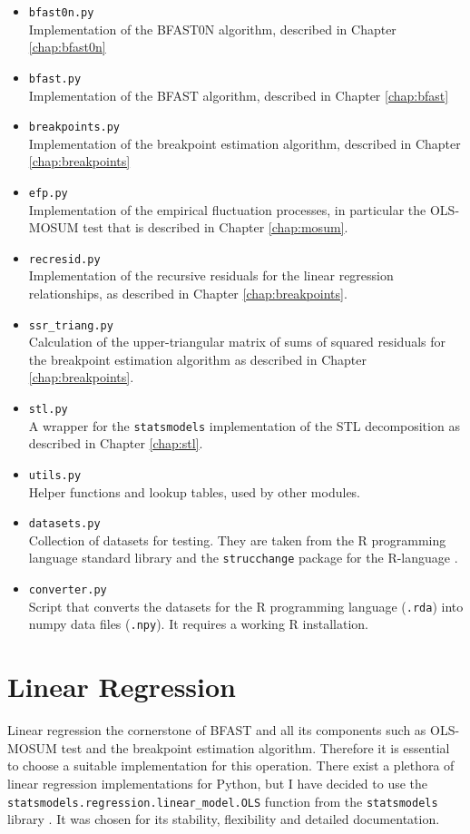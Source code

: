 \documentclass[main.tex]{subfiles}
\begin{document}
\begin{itemize}
\item \texttt{bfast0n.py}\\
  Implementation of the BFAST0N algorithm, described in Chapter \ref{chap:bfast0n}
\item \texttt{bfast.py}\\
  Implementation of the BFAST algorithm, described in Chapter \ref{chap:bfast}
\item \texttt{breakpoints.py}\\
  Implementation of the breakpoint estimation algorithm, described in Chapter \ref{chap:breakpoints}
\item \texttt{efp.py}\\
  Implementation of the empirical fluctuation processes, in particular the OLS-MOSUM test that is
  described in Chapter \ref{chap:mosum}.
\item \texttt{recresid.py}\\
  Implementation of the recursive residuals for the linear regression relationships,
  as described in Chapter \ref{chap:breakpoints}.
\item \texttt{ssr\_triang.py}\\
  Calculation of the upper-triangular matrix of sums of squared residuals for
  the breakpoint estimation algorithm as described in Chapter \ref{chap:breakpoints}.
\item \texttt{stl.py} \\
  A wrapper for the \texttt{statsmodels} \cite{statsmodels} implementation of the STL decomposition as
  described in Chapter \ref{chap:stl}.
\item \texttt{utils.py} \\
  Helper functions and lookup tables, used by other modules. 
\item \texttt{datasets.py}\\
  Collection of datasets for testing. They are taken from the R programming language standard library
  \cite{r-datasets} and
  the \texttt{strucchange} package for the R-language \cite{strucchange_code}.
\item \texttt{converter.py}\\
  Script that converts the datasets for the R programming language (\texttt{.rda}) into numpy
  data files (\texttt{.npy}). It requires a working R installation.
\end{itemize}

\section{Linear Regression}
\label{sec:linear_regression}
Linear regression the cornerstone of BFAST and all
its components such as OLS-MOSUM test and the breakpoint estimation
algorithm. Therefore it is essential to choose a suitable
implementation for this operation. There exist a plethora of linear regression
implementations for Python, but I have decided to use the \texttt{statsmodels.regression.linear\_model.OLS}
function from the \texttt{statsmodels} library \cite{statsmodels}. It was chosen
for its stability, flexibility and detailed documentation.
\end{document}
